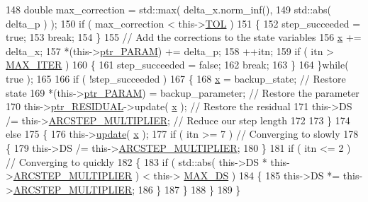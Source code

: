 \begin{DoxyCode}
148             \textcolor{keywordtype}{double} max\_correction = std::max( delta\_x.norm\_inf(),
149                                                                                 std::abs( delta\_p ) );
150             \textcolor{keywordflow}{if} ( max\_correction < this->\hyperlink{classLuna_1_1Newton_a13234002150648ac70297ef68a41c9c7}{TOL} )
151             \{
152                 step\_succeeded = \textcolor{keyword}{true};
153                 \textcolor{keywordflow}{break};
154             \}
155             \textcolor{comment}{// Add the corrections to the state variables}
156             \hyperlink{namespaceHeat__plot_aa88370c16b85b784ccbde3ed88bc1991}{x} += delta\_x;
157             *(this->\hyperlink{classLuna_1_1Arclength_a984cead721a38abf1ab2a489052461e0}{ptr\_PARAM}) += delta\_p;
158             ++itn;
159             \textcolor{keywordflow}{if} ( itn > \hyperlink{classLuna_1_1Newton_ac8245444273c58c656a78ab0544833ce}{MAX\_ITER} )
160             \{
161                 step\_succeeded = \textcolor{keyword}{false};
162                 \textcolor{keywordflow}{break};
163             \}
164         \}\textcolor{keywordflow}{while}( \textcolor{keyword}{true} );
165 
166         \textcolor{keywordflow}{if} ( !step\_succeeded )
167         \{
168             \hyperlink{namespaceHeat__plot_aa88370c16b85b784ccbde3ed88bc1991}{x} = backup\_state;                               \textcolor{comment}{// Restore state}
169             *(this->\hyperlink{classLuna_1_1Arclength_a984cead721a38abf1ab2a489052461e0}{ptr\_PARAM}) = backup\_parameter;          \textcolor{comment}{// Restore the parameter}
170             this->\hyperlink{classLuna_1_1Newton_a5cb2983ea8e24c4832a3fb0bdde84b8f}{ptr\_RESIDUAL}->update( \hyperlink{namespaceHeat__plot_aa88370c16b85b784ccbde3ed88bc1991}{x} );                \textcolor{comment}{// Restore the residual}
171             this->DS /= this->\hyperlink{classLuna_1_1Arclength_ae1ff8d41d3e81d9ce335d19de4a269cc}{ARCSTEP\_MULTIPLIER};           \textcolor{comment}{// Reduce our step length}
172 
173         \}
174         \textcolor{keywordflow}{else}
175         \{
176             this->\hyperlink{classLuna_1_1Arclength_a8941ac2150d8a53aaefbf5825553c86b}{update}( \hyperlink{namespaceHeat__plot_aa88370c16b85b784ccbde3ed88bc1991}{x} );
177             \textcolor{keywordflow}{if} ( itn >= 7 )                                 \textcolor{comment}{// Converging to slowly}
178             \{
179                 this->DS /= this->\hyperlink{classLuna_1_1Arclength_ae1ff8d41d3e81d9ce335d19de4a269cc}{ARCSTEP\_MULTIPLIER};
180             \}
181             \textcolor{keywordflow}{if} ( itn <= 2 )                                 \textcolor{comment}{// Converging to quickly}
182             \{
183                 \textcolor{keywordflow}{if} ( std::abs( this->DS * this->\hyperlink{classLuna_1_1Arclength_ae1ff8d41d3e81d9ce335d19de4a269cc}{ARCSTEP\_MULTIPLIER} ) < this->
      \hyperlink{classLuna_1_1Arclength_a8fcd2b977d7ce78342f113d4e69ad8f1}{MAX\_DS} )
184                 \{
185                     this->DS *= this->\hyperlink{classLuna_1_1Arclength_ae1ff8d41d3e81d9ce335d19de4a269cc}{ARCSTEP\_MULTIPLIER};
186                 \}
187             \}
188         \}
189     \}
\end{DoxyCode}
